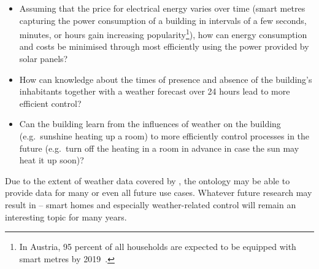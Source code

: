\begin{itemize}
  \item Assuming that the price for electrical energy varies over time (smart metres capturing the power consumption of a building in intervals of a few seconds, minutes, or hours gain increasing popularity\footnote{In Austria, 95 percent of all households are expected to be equipped with smart metres by 2019~\cite{smart_metres_austria}.}), how can energy consumption and costs be minimised through most efficiently using the power provided by solar panels?
  
  \item How can knowledge about the times of presence and absence of the building's inhabitants together with a weather forecast over 24 hours lead to more efficient  control?
  
  \item Can the building learn from the influences of weather on the building (e.g.\ sunshine heating up a room) to more efficiently control processes in the future (e.g.\ turn off the heating in a room in advance in case the sun may heat it up soon)?
\end{itemize}

Due to the extent of weather data covered by \smarthomeweather, the ontology may be able to provide data for many or even all future use cases. Whatever future research may result in -- smart homes and especially weather-related control will remain an interesting topic for many years.
